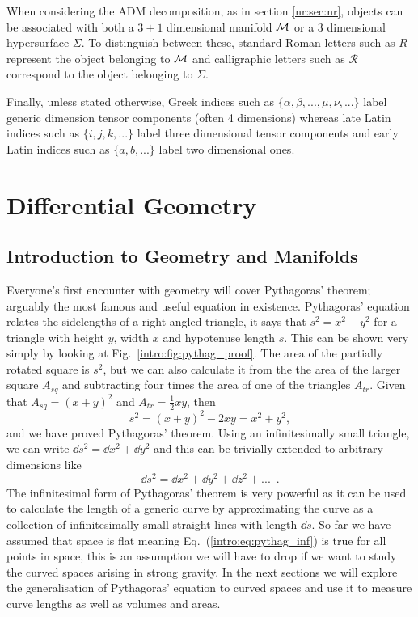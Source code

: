 When considering the ADM decomposition, as in section \ref{nr:sec:nr}, objects can be associated with both a $3+1$ dimensional manifold $\mathcal{M}$ or a $3$ dimensional hypersurface $\Sigma$. To distinguish between these, standard Roman letters such as $R$ represent the object belonging to $\mathcal{M}$ and calligraphic letters such as $\mathcal{R}$ correspond to the object belonging to $\Sigma$. 

Finally, unless stated otherwise, Greek indices such
as $\{\alpha, \beta, ..., \mu, \nu, ...\}$ label generic dimension tensor components (often 4 dimensions) whereas late Latin indices such as $\{i, j, k, ...\}$ label
three dimensional tensor components and early Latin indices such as $\{a, b, ...\}$ label two dimensional ones. 




\section{Differential Geometry}
\subsection{Introduction to Geometry and Manifolds}





Everyone's first encounter with geometry will cover Pythagoras' theorem; arguably the most famous and useful equation in existence. Pythagoras' equation relates the sidelengths of a right angled triangle, it says that $s^2 = x^2 + y^2$ for a triangle with height $y$, width $x$ and hypotenuse length $s$. This can be shown very simply by looking at Fig.~\ref{intro:fig:pythag_proof}. The area of the partially rotated square is $s^2$, but we can also calculate it from the the area of the larger square $A_{sq}$ and subtracting four times the area of one of the triangles $A_{tr}$. Given that $A_{sq} = (x+y)^2$ and $A_{tr} = \frac{1}{2}xy$, then 
\begin{equation}
s^2 = (x+y)^2-2xy = x^2 + y^2,
\end{equation}
and we have proved Pythagoras' theorem. Using an infinitesimally small triangle, we can write $\dd s^2 = \dd x^2 + \dd y^2$ and this can be trivially extended to arbitrary dimensions like
\begin{equation}\label{intro:eq:pythag_inf}
\dd s^2 = \dd x^2 + \dd y^2 + \dd z^2 + ...\,\,\,.
\end{equation}
The infinitesimal form of Pythagoras' theorem is very powerful as it can be used to calculate the length of a generic curve by approximating the curve as a collection of infinitesimally small straight lines with length $\dd s$. So far we have assumed that space is flat meaning Eq.~(\ref{intro:eq:pythag_inf}) is true for all points in space, this is an assumption we will have to drop if we want to study the curved spaces arising in strong gravity. In the next sections we will explore the generalisation of Pythagoras' equation to curved spaces and use it to measure curve lengths as well as volumes and areas.

